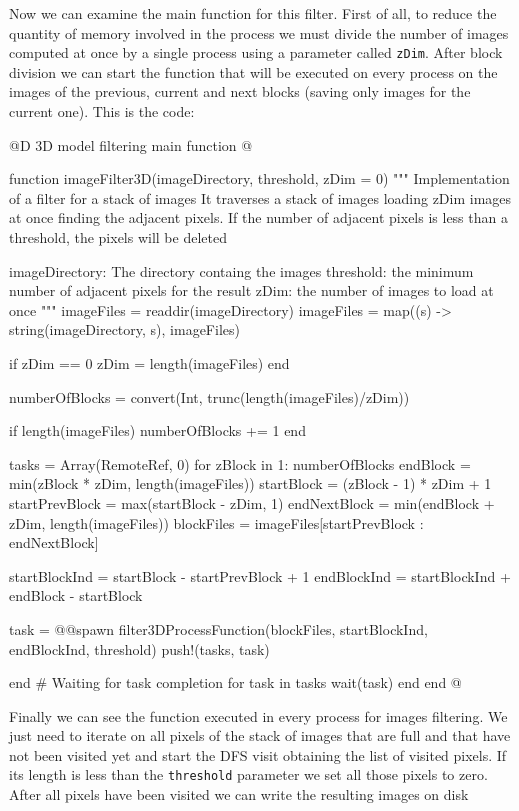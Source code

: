 \documentclass[11pt,oneside]{article}	%
\begin{document}
Now we can examine the main function for this filter. First of all, to reduce the quantity of memory involved in the process we must divide the number of images computed at once by a single process using a parameter called \texttt{zDim}. After block division we can start the function that will be executed on every process on the images of the previous, current and next blocks (saving only images for the current one). This is the code:

@D 3D model filtering main function
@{function imageFilter3D(imageDirectory, threshold, zDim = 0)
  """
  Implementation of a filter for a stack of images
  It traverses a stack of images loading zDim images
  at once finding the adjacent pixels. If the number of
  adjacent pixels is less than a threshold, the pixels
  will be deleted

  imageDirectory: The directory containg the images
  threshold: the minimum number of adjacent pixels for the result
  zDim: the number of images to load at once
  """
  imageFiles = readdir(imageDirectory)
  imageFiles = map((s) -> string(imageDirectory, s), imageFiles)

  if zDim == 0
    zDim = length(imageFiles)
  end
  
  numberOfBlocks = convert(Int, trunc(length(imageFiles)/zDim))

  if length(imageFiles) %
    numberOfBlocks += 1
  end
  
  tasks = Array(RemoteRef, 0)
  for zBlock in 1: numberOfBlocks
    endBlock = min(zBlock * zDim, length(imageFiles))
    startBlock = (zBlock - 1) * zDim + 1
    startPrevBlock = max(startBlock - zDim, 1)
    endNextBlock = min(endBlock + zDim, length(imageFiles))
    blockFiles = imageFiles[startPrevBlock : endNextBlock]
    
    startBlockInd = startBlock - startPrevBlock + 1
    endBlockInd  = startBlockInd + endBlock - startBlock
    
    task = @@spawn filter3DProcessFunction(blockFiles, startBlockInd, endBlockInd, threshold)
    push!(tasks, task)
    
  end
  # Waiting for task completion
  for task in tasks
    wait(task)
  end
end @}

Finally we can see the function executed in every process for images filtering. We just need to iterate on all pixels of the stack of images that are full and that have not been visited yet and start the DFS visit obtaining the list of visited pixels. If its length is less than the \texttt{threshold} parameter we set all those pixels to zero. After all pixels have been visited we can write the resulting images on disk
\end{document}
